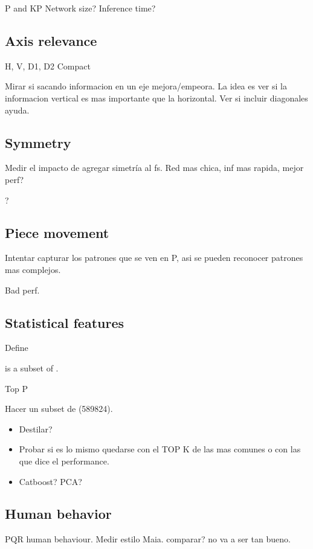 P and KP
Network size?
Inference time?

\subsection{Axis relevance}

H, V, D1, D2
Compact

Mirar si sacando informacion en un eje mejora/empeora. La idea es ver si la informacion vertical es mas importante que la horizontal. Ver si incluir diagonales ayuda.

\subsection{Symmetry}

Medir el impacto de agregar simetría al fs. Red mas chica, inf mas rapida, mejor perf?

?

\subsection{Piece movement}

Intentar capturar los patrones que se ven en P, asi se pueden reconocer patrones mas complejos.


Bad perf.

\subsection{Statistical features}

Define 

 is a subset of .

Top P

Hacer un subset de  (589824).

\begin{itemize}
\item Destilar?
\item Probar si es lo mismo quedarse con el TOP K de las mas comunes o con las que dice el performance.
\item Catboost? PCA?
\end{itemize}

\subsection{Human behavior}

PQR human behaviour. Medir estilo Maia. comparar? no va a ser tan bueno.
